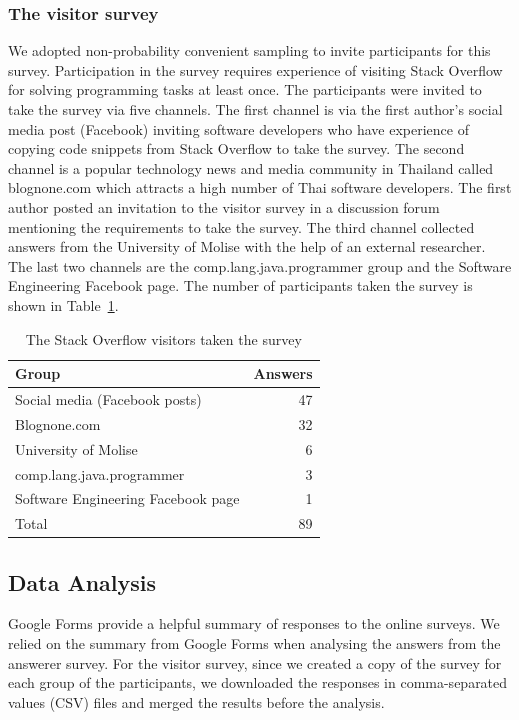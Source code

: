 \documentclass{svjour3}                     %
\begin{document}
\subsubsection{The visitor survey} 
We adopted non-probability convenient sampling to invite participants for this
survey. Participation in the survey requires experience of visiting Stack
Overflow for solving programming tasks at least once. The participants were
invited to take the survey via five channels. The first channel is via the first
author's social media post (Facebook) inviting software developers who have
experience of copying code snippets from Stack Overflow to take the survey. The
second channel is a popular technology news and media community in Thailand
called \textsf{blognone.com} which attracts a high number of Thai software
developers. The first author posted an invitation to the visitor survey in a
discussion forum mentioning the requirements to take the survey. The third
channel collected answers from the University of Molise with the help of an
external researcher. The last two channels are the
\textsf{comp.lang.java.programmer} group and the Software Engineering
Facebook page. The number of participants taken the survey is shown in
Table~\ref{tab:visitors}.

\begin{table}
	\centering
	\caption{The Stack Overflow visitors taken the survey}
	\label{tab:visitors}
	\begin{tabular}{lr}
		\toprule
		Group & Answers \\
		\midrule
		Social media (Facebook posts) & 47 \\
		Blognone.com & 32 \\
		University of Molise & 6 \\
		comp.lang.java.programmer & 3 \\
		Software Engineering Facebook page & 1 \\
		\midrule
		Total & 89 \\
		\bottomrule
	\end{tabular}
\end{table}

\subsection{Data Analysis}
Google Forms provide a helpful summary of responses to the online surveys. We
relied on the summary from Google Forms when analysing the answers from the
answerer survey. For the visitor survey, since we created a copy of the survey for each
group of the participants, we downloaded the responses in comma-separated values
(CSV) files and merged the results before the analysis.
\end{document}
